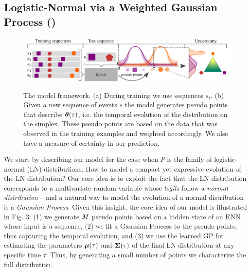 \subsection{Logistic-Normal via a Weighted Gaussian Process (\GPModel)}
\label{GP}

\begin{figure}
	\centering
	\includegraphics[width=\linewidth]{sections/010_neurips2019/paper/images/model_schema.pdf}
	\begin{subfigure}{0.3\textwidth}
		\caption{} \label{fig:model_illustration_1}
	\end{subfigure}
	\begin{subfigure}{0.69\textwidth}
		\caption{} \label{fig:model_illustration_2}
	\end{subfigure}
	\vspace*{-0.5cm}
    \caption{The model framework. (a) During training we use sequences $s_i$. (b) Given a new sequence of events $s$ the model generates pseudo points that describe $\bm{\theta}(\tau)$, i.e. the temporal evolution of the distribution on the simplex. These pseudo points are based on the data that was observed in the training examples and weighted accordingly. We also have a measure of certainty in our prediction.}\label{fig:model_illustration}
    \vspace*{-0.5cm}
\end{figure}

We start by describing our model for the case when $P$ is the family of logistic-normal (LN) distributions.
How to model a compact yet expressive evolution of the LN distribution?
Our core idea is to exploit the fact that the LN distribution corresponds to a multivariate random variable whose \textit{logits} follow a \textit{normal distribution} -- and a natural way to model the evolution of a normal distribution is a \textit{Gaussian Process}. Given this insight, the core idea of our model is illustrated in Fig. \ref{fig:model_illustration}: (1) we generate $M$ pseudo points based on a hidden state of an RNN whose input is a sequence, (2) we fit a Gaussian Process to the pseudo points, thus capturing the temporal evolution, and (3) we use the learned GP for estimating the parameters $\bm \mu(\tau)$ and $\bm \Sigma(\tau)$ of the final LN distribution at any specific time $\tau$. Thus, by generating a small number of points we characterize the full distribution.

